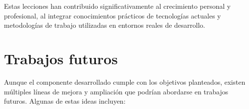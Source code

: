 \documentclass[a4paper, 12pt]{book}
\begin{document}
Estas lecciones han contribuido significativamente al crecimiento personal y profesional, al integrar conocimientos prácticos de tecnologías actuales y metodologías de trabajo utilizadas en entornos reales de desarrollo.


\section{Trabajos futuros}
\label{sec:trabajos_futuros}



Aunque el componente desarrollado cumple con los objetivos planteados, existen múltiples líneas de mejora y ampliación que podrían abordarse en trabajos futuros. Algunas de estas ideas incluyen:
\end{document}
